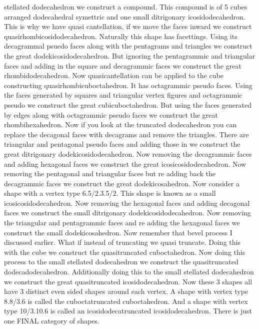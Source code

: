 \documentclass{article}
\begin{document}
stellated dodecahedron we construct a compound. This compound is of 5 cubes arranged dodecahedral symettric and one small ditrigonary icosidodecahedron.  This is why we have quasi cantellation, if we move the faces inward we construct quasirhombicosidodecahedron. Naturally this shape has facettings. Using its decagrammal psuedo faces along with the pentagrams and triangles we construct the great dodekicosidodecahedron. But ignoring the pentagrammic and triangular faces and adding in the square and decagrammic faces we construct the great rhombidodecahedron. Now quasicantellation can be applied to the cube constructing quasirhombicuboctahedron. It has octagrammic pseudo faces. Using the faces generated by squares and triangular vertex figures and octagrammic pseudo we construct the great cubicuboctahedron. But using the faces generated by edges along with octagrammic pseudo faces we construct the great rhombihexahedron. Now if you look at the truncated dodecahedron you can replace the decagonal faces with decagrams and remove the triangles. There are triangular and pentagonal pseudo faces and adding those in we construct the great ditrigonary dodekicosidodecahedron. Now removing the decagrammic faces and adding hexagonal faces we construct the great icosicosidodecahedron.  Now removing the pentagonal and triangular faces but re adding back the decagrammic faces we construct the great dodekicosahedron. Now consider a shape with a vertex type 6.5/2.3.5/2. This shape is known as a small icosicosidodecahedron. Now removing the hexagonal faces and adding decagonal faces we construct the small ditrigonary dodekicosidodecahedron. Now removing the triangular and pentagrammic faces and re adding the hexagonal faces we construct the small dodekicosahedron.  Now remember that bevel process I discussed earlier. What if instead of truncating we quasi truncate. Doing this with the cube we construct the quasitruncated cuboctahedron. Now doing this process to the small stellated dodecahedron we construct the quasitruncated dodecadodecahedron. Additionally doing this to the small stellated dodecahedron we construct the great quasitruncated icosidodecahedron. Now these 3 shapes all have 3 distinct even sided shapes around each vertex. A shape with vertex type 8.8/3.6 is called the cuboctatruncated cuboctahedron. And a shape with vertex type 10/3.10.6 is called an icosidodecatruncated icosidodecahedron. There is just one FINAL category of shapes.
\end{document}
